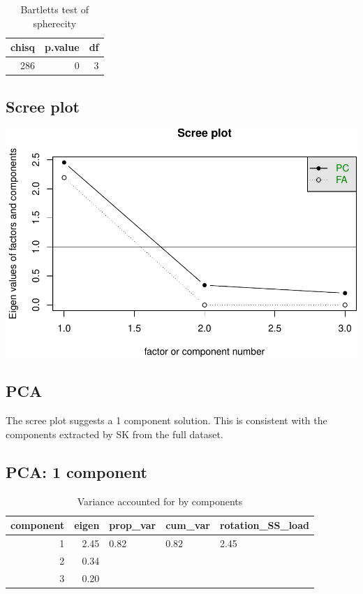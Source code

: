 \documentclass[]{article}
\begin{document}
\begin{table}[H]

\caption{\label{tab:unnamed-chunk-24}Bartletts test of spherecity}
\centering
\fontsize{6}{8}\selectfont
\begin{tabular}[t]{rrr}
\toprule
chisq & p.value & df\\
\midrule
286 & 0 & 3\\
\bottomrule
\end{tabular}
\end{table}

\hypertarget{scree-plot-4}{%
\subsection{Scree plot}\label{scree-plot-4}}

\includegraphics{PCA_covid_files/figure-latex/unnamed-chunk-25-1.pdf}

\hypertarget{pca}{%
\subsection{PCA}\label{pca}}

The scree plot suggests a 1 component solution. This is consistent with
the components extracted by SK from the full dataset.

\hypertarget{pca-1-component-1}{%
\subsection{PCA: 1 component}\label{pca-1-component-1}}

\begin{table}[H]

\caption{\label{tab:unnamed-chunk-26}Variance accounted for by components}
\centering
\fontsize{6}{8}\selectfont
\begin{tabular}[t]{rrlll}
\toprule
component & eigen & prop\_var & cum\_var & rotation\_SS\_load\\
\midrule
1 & 2.45 & 0.82 & 0.82 & 2.45\\
2 & 0.34 &  &  & \\
3 & 0.20 &  &  & \\
\bottomrule
\end{tabular}
\end{table}
\end{document}
